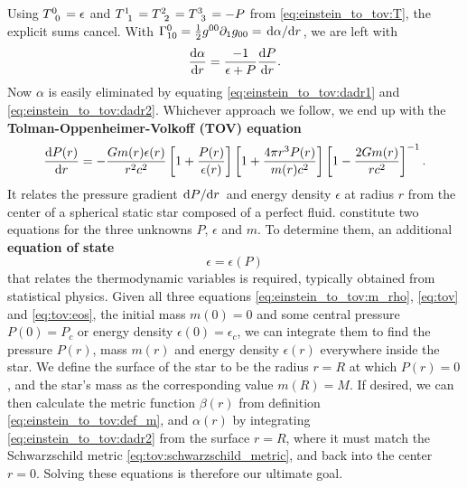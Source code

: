 Using $T\indices{^0_0} = \epsilon$ and $T\indices{^1_1} = T\indices{^2_2} = T\indices{^3_3} = -P$ from \cref{eq:einstein_to_tov:T}, the explicit sums cancel.
With $\Gamma^0_{10} = \frac12 g^{00} \partial_1 g_{00} = \odv{\alpha}/{r}$, we are left with
\begin{equation}
	\odv{\alpha}{r} = \frac{-1}{\epsilon+P} \odv{P}{r} .
	\label{eq:einstein_to_tov:dadr2}
\end{equation}
Now $\alpha$ is easily eliminated by equating \eqref{eq:einstein_to_tov:dadr1} and \eqref{eq:einstein_to_tov:dadr2}. 
Whichever approach we follow, we end up with the \textbf{Tolman-Oppenheimer-Volkoff (TOV) equation}
\begin{equation}
	\odv{P(r)}{r} = -\frac{G m(r) \epsilon(r)}{r^2 c^2} \left[ 1 + \frac{P(r)}{\epsilon(r)} \right] \left[ 1 + \frac{4 \pi r^3 P(r)}{m(r) c^2} \right] \left[ 1 - \frac{2 G m(r)}{r c^2} \right]^{-1} .
	\label{eq:tov}
\end{equation}
It relates the pressure gradient $\odv{P}/{r}$ and energy density $\epsilon$ at radius $r$ from the center of a spherical static star composed of a perfect fluid.
 constitute two equations for the three unknowns $P$, $\epsilon$ and $m$.
To determine them, an additional \textbf{equation of state}
\begin{equation}
	\epsilon = \epsilon(P)
\label{eq:tov:eos}
\end{equation}
that relates the thermodynamic variables is required, typically obtained from statistical physics.
Given all three equations \eqref{eq:einstein_to_tov:m_rho}, \eqref{eq:tov} and \eqref{eq:tov:eos}, the initial mass $m(0) = 0$ and some central pressure $P(0) = P_c$ or energy density $\epsilon(0) = \epsilon_c$, we can integrate them to find the pressure $P(r)$, mass $m(r)$ and energy density $\epsilon(r)$ everywhere inside the star.
We define the surface of the star to be the radius $r=R$ at which $P(r) = 0$, and the star's mass as the corresponding value $m(R) = M$.
If desired, we can then calculate the metric function $\beta(r)$ from definition \eqref{eq:einstein_to_tov:def_m}, and $\alpha(r)$ by integrating \cref{eq:einstein_to_tov:dadr2} from the surface $r=R$, where it must match the Schwarzschild metric \eqref{eq:tov:schwarzschild_metric}, and back into the center $r=0$.
Solving these equations is therefore our ultimate goal.

